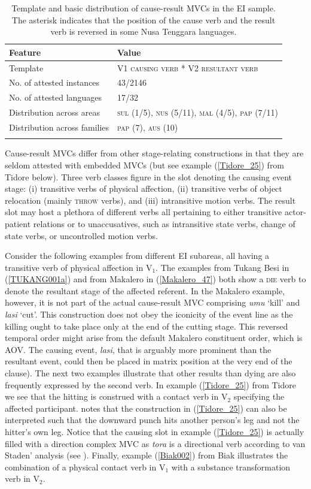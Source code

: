 \begin{table}
\begin{tabular}{ll}
\lsptoprule
Feature&Value\tabularnewline
\hline
Template&V1 \textsc{causing verb} * V2 \textsc{resultant verb}\tabularnewline
No. of attested instances& 43/2146 \tabularnewline
No. of attested languages& 17/32 \tabularnewline
Distribution across areas& \textsc{sul} (1/5), \textsc{nus} (5/11), \textsc{mal} (4/5), \textsc{pap} (7/11) \tabularnewline
Distribution across families& \textsc{pap} (7), \textsc{aus} (10) \tabularnewline
\lspbottomrule
\end{tabular}
\caption[Template and basic distribution of cause-result MVCs]{Template and basic distribution of cause-result MVCs in the EI sample. The asterisk indicates that the position of the cause verb and the result verb is reversed in some Nusa Tenggara languages.}
\label{table:cause-result}
\end{table}

Cause-result MVCs differ from other stage-relating constructions in that they are seldom attested with embedded MVCs (but see example (\ref{Tidore_25}) from Tidore below). Three verb classes figure in the slot denoting the causing event stage: (i) transitive verbs of physical affection, (ii) transitive verbs of object relocation (mainly \textsc{throw} verbs), and (iii) intransitive motion verbs. The result slot may host a plethora of different verbs all pertaining to either transitive actor-patient relations or to unaccusatives, such as intransitive state verbs, change of state verbs, or uncontrolled motion verbs. 

Consider the following examples from different EI subareas, all having a transitive verb of physical affection in V$_1$. The examples from Tukang Besi in (\ref{TUKANG001a}) and from Makalero in (\ref{Makalero_47}) both show a \textsc{die} verb to denote the resultant stage of the affected referent. In the Makalero example, however, it is not part of the actual cause-result MVC comprising \textit{umu} `kill' and \textit{lasi} `cut'. This construction does not obey the iconicity of the event line as the killing ought to take place only at the end of the cutting stage. This reversed temporal order might arise from the default Makalero constituent order, which is AOV. The causing event, \textit{lasi}, that is arguably more prominent than the resultant event, could then be placed in matrix position at the very end of the clause). The next two examples illustrate that other results than dying are also frequently expressed by the second verb. In example (\ref{Tidore_25}) from Tidore we see that the hitting is construed with a contact verb in V$_2$ specifying the affected participant. \citet[126]{vanstaden2000tidore} notes that the construction in (\ref{Tidore_25}) can also be interpreted such that the downward punch hits another person's leg and not the hitter's own leg. Notice that the causing slot in example (\ref{Tidore_25}) is actually filled with a direction complex MVC as \textit{tora} is a directional verb according to van Staden' analysis (see \citealt[110]{vanstaden2000tidore}).  Finally, example (\ref{Biak002}) from Biak illustrates the combination of a physical contact verb in V$_1$ with a substance transformation verb in V$_2$.

